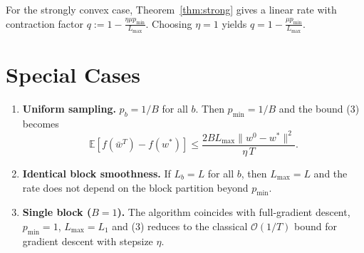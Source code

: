 \documentclass{article}
\newcommand{\E}{\mathbb{E}}
\begin{document}
For the strongly convex case, Theorem~\ref{thm:strong} gives a linear rate with
contraction factor $q:=1-\frac{\eta\mu p_{\min}}{L_{\max}}$.
Choosing $\eta=1$ yields $q=1-\frac{\mu p_{\min}}{L_{\max}}$.

\section*{Special Cases}
\begin{enumerate}
\item \textbf{Uniform sampling.}  $p_{b}=1/B$ for all $b$.  Then $p_{\min}=1/B$ and the bound (3) becomes
\[
\E[f(\bar w^{T})-f(w^{*})]\le
\frac{2B L_{\max}\|w^{0}-w^{*}\|^{2}}{\eta\,T}.
\]
\item \textbf{Identical block smoothness.}  If $L_{b}=L$ for all $b$, then $L_{\max}=L$ and the
rate does not depend on the block partition beyond $p_{\min}$.
\item \textbf{Single block ($B=1$).}  The algorithm coincides with full‑gradient descent,
$p_{\min}=1$, $L_{\max}=L_{1}$ and (3) reduces to the classical
$\mathcal O(1/T)$ bound for gradient descent with stepsize $\eta$.
\end{enumerate}
\end{document}
